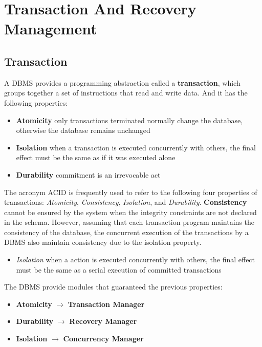 \chapter{Transaction And Recovery Management}
\section{Transaction}
A DBMS provides a programming abstraction called a \textbf{transaction}, which groups together a set of instructions that read and write data. And it has the following properties:
\begin{itemize}
    \item \textbf{Atomicity} only transactions terminated normally change the database, otherwise the database remains unchanged
    \item \textbf{Isolation} when a transaction is executed concurrently with others, the final effect must be the same as if it was executed alone
    \item \textbf{Durability} commitment is an irrevocable act
\end{itemize}

The acronym ACID is frequently used to refer to the following four properties of transactions: \textit{Atomicity}, \textit{Consistency}, \textit{Isolation}, and \textit{Durability}. \textbf{Consistency} cannot be ensured by the system when the integrity constraints are not declared in the schema. However, assuming that each transaction program maintains the consistency of the database, the concurrent execution of the transactions by a DBMS also maintain consistency due to the isolation property.

\begin{itemize}
    \item \textit{Isolation} when a action is executed concurrently with others, the final effect must be the same as a serial execution of committed transactions
\end{itemize}

The DBMS provide modules that guaranteed the previous properties:
\begin{itemize}
    \item \textbf{Atomicity} $\rightarrow$ \textbf{Transaction Manager}
    \item \textbf{Durability} $\rightarrow$ \textbf{Recovery Manager}
    \item \textbf{Isolation} $\rightarrow$ \textbf{Concurrency Manager}
\end{itemize}

